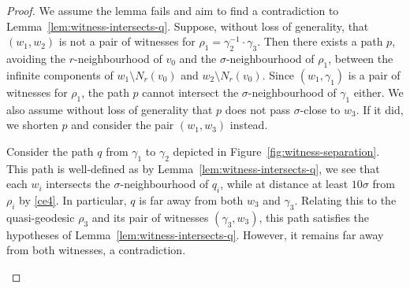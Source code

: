 \documentclass[11pt,a4paper]{amsart}
\theoremstyle{definition}
\begin{document}
\begin{proof}
    We assume the lemma fails and aim to find a contradiction to Lemma~\ref{lem:witness-intersects-q}.
    Suppose, without loss of generality, that $(w_1,w_2)$ is not a pair of witnesses for $\rho_1 = \gamma_2^{-1}\cdot \gamma_3$. Then there exists a path $p$, avoiding the $r$-neighbourhood of $v_0$ and the $\sigma$-neighbourhood of $\rho_1$, between the infinite components of $w_1 \setminus N_r(v_0)$ and $w_2 \setminus N_r(v_0)$.
    Since $(w_1,\gamma_1)$ is a pair of witnesses for $\rho_1$, the path $p$ cannot intersect the $\sigma$-neighbourhood of $\gamma_1$ either. 
    We also assume without loss of generality that $p$ does not pass $\sigma$-close to $w_3$. If it did, we shorten $p$ and consider the pair $(w_1,w_3)$ instead.

    Consider the path  $q$ from $\gamma_1$ to $\gamma_2$ depicted  in Figure~\ref{fig:witness-separation}. This path is well-defined as by Lemma~\ref{lem:witness-intersects-q}, we see that each $w_i$ intersects the $\sigma$-neighbourhood of $q_i$, while at distance at least $10\sigma$ from $\rho_i$ by \ref{ce4}. In particular, $q$ is far away from both $w_3$ and $\gamma_3$. Relating this to the quasi-geodesic $\rho_3$ and its pair of witnesses $(\gamma_3, w_3)$, this path satisfies the hypotheses of Lemma~\ref{lem:witness-intersects-q}. However, it remains far away from both witnesses, a contradiction. 
    \begin{figure}[ht]
        \centering



\begin{tikzpicture}[x=0.75pt,y=0.75pt,yscale=-1,xscale=1]


\end{tikzpicture}
\end{figure}
\end{proof}
\end{document}
